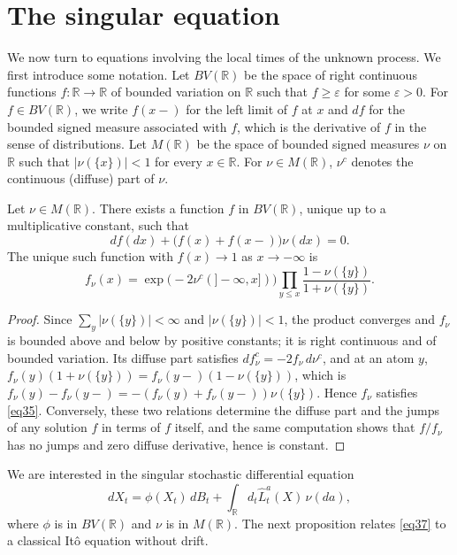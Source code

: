 \section{The singular equation}

We now turn to equations involving the local times of the unknown process. We
first introduce some notation. Let $BV(\mathbb{R})$ be the space of right
continuous functions $f:\mathbb{R}\to\mathbb{R}$ of bounded variation on
$\mathbb{R}$ such that $f\geqslant \varepsilon$ for some $\varepsilon > 0$. For
$f \in BV(\mathbb{R})$, we write $f(x-)$ for the left limit of $f$ at $x$ and
$df$ for the bounded signed measure associated with $f$, which is the derivative
of $f$ in the sense of distributions. Let $M(\mathbb{R})$ be the space of
bounded signed measures $\nu$ on $\mathbb{R}$ such that $|\nu (\{x\})| < 1$ for
every $x\in \mathbb{R}$. For $\nu \in M(\mathbb{R})$, $\nu^c$ denotes the
continuous (diffuse) part of $\nu$.

\begin{lemma}\label{lem:fnu}
	Let $\nu\in M(\mathbb{R})$. There exists a function $f$ in $BV(\mathbb{R})$,
	unique up to a multiplicative constant, such that
	\begin{equation}\label{eq35}
		df(dx)+\big(f(x)+f(x-)\big)\nu(dx)=0 .
	\end{equation}
	The unique such function with $f(x)\to 1$ as $x\to -\infty$ is
	\begin{equation}\label{eq36}
		f_\nu(x)=\exp\big(-2\nu^c(]-\infty, x])\big)\prod_{y\leqslant x}
		\frac{1-\nu (\{ y\})}{1+\nu (\{ y\} )} .
	\end{equation}
\end{lemma}

\begin{proof}
	Since $\sum_y |\nu(\{y\})| < \infty$ and $|\nu(\{y\})|<1$, the product converges
	and $f_\nu$ is bounded above and below by positive constants; it is right
	continuous and of bounded variation. Its diffuse part satisfies
	$df^c_\nu = -2f_\nu\,d\nu^c$, and at an atom $y$,
	$f_\nu(y) (1+\nu(\{y\})) = f_\nu(y-)(1-\nu(\{y\}))$, which is
	$f_\nu(y) - f_\nu(y-) = -(f_\nu(y) + f_\nu(y-))\nu(\{y\})$. Hence $f_\nu$ satisfies
	\eqref{eq35}. Conversely, these two relations determine the diffuse part and
	the jumps of any solution $f$ in terms of $f$ itself, and the same computation
	shows that $f/f_\nu$ has no jumps and zero diffuse derivative, hence is constant.
\end{proof}

We are interested in the singular stochastic differential equation
\begin{equation}\label{eq37}
	dX_t=\phi(X_t)\,dB_t+\int_\mathbb{R} d_t \hat{L}_t^a (X)\,\nu(da) ,
\end{equation}
where $\phi$ is in $BV(\mathbb{R})$ and $\nu$ is in $M(\mathbb{R})$. The next
proposition relates \eqref{eq37} to a classical It\^o equation without drift.

